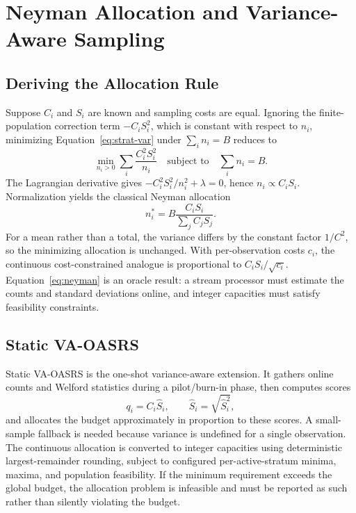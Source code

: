 \documentclass[11pt]{article}
\begin{document}
\section{Neyman Allocation and Variance-Aware Sampling}

\subsection{Deriving the Allocation Rule}

Suppose $C_i$ and $S_i$ are known and sampling costs are equal. Ignoring the finite-population correction term $-C_iS_i^2$, which is constant with respect to $n_i$, minimizing Equation~\ref{eq:strat-var} under $\sum_i n_i=B$ reduces to
\begin{equation}
 \min_{n_i>0}\sum_i\frac{C_i^2S_i^2}{n_i}
 \quad\text{subject to}\quad \sum_i n_i=B.
\end{equation}
The Lagrangian derivative gives $-C_i^2S_i^2/n_i^2+\lambda=0$, hence $n_i\propto C_iS_i$. Normalization yields the classical Neyman allocation
\begin{equation}
 n_i^*=B\frac{C_iS_i}{\sum_j C_jS_j}.
 \label{eq:neyman}
\end{equation}
For a mean rather than a total, the variance differs by the constant factor $1/C^2$, so the minimizing allocation is unchanged. With per-observation costs $c_i$, the continuous cost-constrained analogue is proportional to $C_iS_i/\sqrt{c_i}$. Equation~\ref{eq:neyman} is an oracle result: a stream processor must estimate the counts and standard deviations online, and integer capacities must satisfy feasibility constraints.

\subsection{Static VA-OASRS}

Static VA-OASRS is the one-shot variance-aware extension. It gathers online counts and Welford statistics during a pilot/burn-in phase, then computes scores
\begin{equation}
 q_i=C_i\widehat{S}_i,\qquad \widehat{S}_i=\sqrt{\widehat{S}_i^2},
 \label{eq:static-score}
\end{equation}
and allocates the budget approximately in proportion to these scores. A small-sample fallback is needed because variance is undefined for a single observation. The continuous allocation is converted to integer capacities using deterministic largest-remainder rounding, subject to configured per-active-stratum minima, maxima, and population feasibility. If the minimum requirement exceeds the global budget, the allocation problem is infeasible and must be reported as such rather than silently violating the budget.
\end{document}
